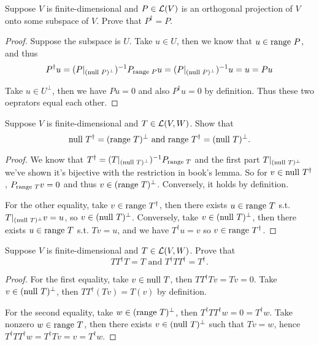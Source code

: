 \documentclass{extarticle}
\begin{document}
\begin{problem}{19}
    Suppose \(V\) is finite-dimensional and \(P \in \mathcal{L}(V)\) is an orthogonal projection of \(V\) onto 
    some subspace of \(V\). Prove that \(P^\dagger = P\).
\end{problem}

\begin{proof}
Suppose the subspace is \(U\). Take \(u \in U\), then we know that \(u \in \text{range } P\), and thus  
\begin{align*}
    P^\dagger u = (P|_{(\text{null } P)^\perp})^{-1} P_{\text{range } P} u =  (P|_{(\text{null } P)^\perp})^{-1} u  = u = Pu 
\end{align*}

Take \(u \in U^\perp\), then we have \(Pu = 0\) and also \(P^\dagger u = 0\) by definition. Thus these two oeprators 
equal each other.
\end{proof}

\begin{problem}{20}
    Suppose \(V\) is finite-dimensional and \(T \in \mathcal{L}(V, W)\). Show that 
    \[\text{null } T^\dagger = (\text{range } T)^\perp \text{  and  } \text{range } T^\dagger = (\text{null } T)^\perp.\]
\end{problem}

\begin{proof}
We know that \(T^\dagger = (T|_{(\text{null } T)^\perp})^{-1} P_{\text{range } T}\) and the first part \(T|_{(\text{null } T)^\perp}\) 
we've shown it's bijective with the restriction in book's lemma. So for \(v \in \text{null } T^\dagger\), 
\(P_{\text{range } T}v = 0\) and thus \(v \in (\text{range } T)^\perp\). Conversely, it holds by definition. 


For the other equality, take \(v \in \text{range } T^\dagger\), then there exists \(u \in \text{range } T\) s.t. 
\(T|_{(\text{null } T)^\perp} v = u\), so \(v \in (\text{null } T)^\perp\). Conversely, take \(v \in (\text{null } T)^\perp\), then 
there exists \(u \in \text{range } T\) s.t. \(Tv = u\), and we have \(T^\dagger u =v\) so \(v \in \text{range } T^\dagger\).
\end{proof}


\begin{problem}{22}
    Suppose \(V\) is finite-dimensional and \(T \in \mathcal{L}(V, W)\). Prove that 
    \[TT^\dagger T = T \text{  and  } T^\dagger T T^\dagger = T^\dagger.\]
\end{problem}

\begin{proof}
For the first equality, take \(v \in \text{null } T\), then \(TT^\dagger T v = Tv = 0\). Take \(v \in (\text{null } T)^\perp\), 
then \(TT^\dagger (Tv) = T(v)\) by definition. 

For the second equality, take \(w \in (\text{range } T)^\perp\), then \(T^\dagger T T^\dagger w = 0 = T^\dagger w\). 
Take nonzero \(w \in \text{range } T\), then there exists \(v \in (\text{null } T)^\perp\) such that \(Tv = w\), hence 
\(T^\dagger T T^\dagger w = T^\dagger Tv = v = T^\dagger w\). 
\end{proof}
\end{document}
